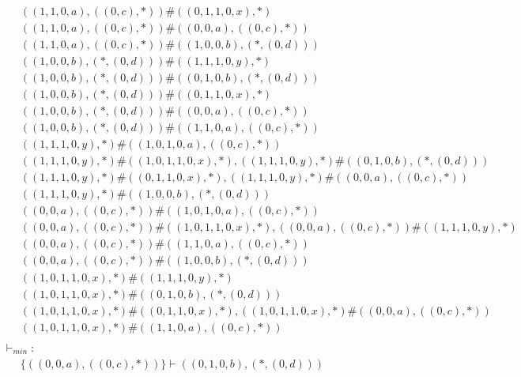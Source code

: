 \documentclass{article}
\begin{document}
\begin{align*}
	 & \qquad ((1, 1, 0, a), ((0, c), *)) \# ((0, 1, 1, 0, x), *) \\ 
	 & \qquad ((1, 1, 0, a), ((0, c), *)) \# ((0, 0, a), ((0, c), *)) \\ 
	 & \qquad ((1, 1, 0, a), ((0, c), *)) \# ((1, 0, 0, b), (*, (0, d))) \\ 
	 & \qquad ((1, 0, 0, b), (*, (0, d))) \# ((1, 1, 1, 0, y), *) \\ 
	 & \qquad ((1, 0, 0, b), (*, (0, d))) \# ((0, 1, 0, b), (*, (0, d))) \\ 
	 & \qquad ((1, 0, 0, b), (*, (0, d))) \# ((0, 1, 1, 0, x), *) \\ 
	 & \qquad ((1, 0, 0, b), (*, (0, d))) \# ((0, 0, a), ((0, c), *)) \\ 
	 & \qquad ((1, 0, 0, b), (*, (0, d))) \# ((1, 1, 0, a), ((0, c), *)) \\ 
	 & \qquad ((1, 1, 1, 0, y), *) \# ((1, 0, 1, 0, a), ((0, c), *)) \\ 
	 & \qquad ((1, 1, 1, 0, y), *) \# ((1, 0, 1, 1, 0, x), *), ((1, 1, 1, 0, y), *) \# ((0, 1, 0, b), (*, (0, d))) \\ 
	 & \qquad ((1, 1, 1, 0, y), *) \# ((0, 1, 1, 0, x), *), ((1, 1, 1, 0, y), *) \# ((0, 0, a), ((0, c), *)) \\ 
	 & \qquad ((1, 1, 1, 0, y), *) \# ((1, 0, 0, b), (*, (0, d))) \\ 
	 & \qquad ((0, 0, a), ((0, c), *)) \# ((1, 0, 1, 0, a), ((0, c), *)) \\ 
	 & \qquad ((0, 0, a), ((0, c), *)) \# ((1, 0, 1, 1, 0, x), *), ((0, 0, a), ((0, c), *)) \# ((1, 1, 1, 0, y), *) \\ 
	 & \qquad ((0, 0, a), ((0, c), *)) \# ((1, 1, 0, a), ((0, c), *)) \\ 
	 & \qquad ((0, 0, a), ((0, c), *)) \# ((1, 0, 0, b), (*, (0, d))) \\ 
	 & \qquad ((1, 0, 1, 1, 0, x), *) \# ((1, 1, 1, 0, y), *) \\ 
	 & \qquad ((1, 0, 1, 1, 0, x), *) \# ((0, 1, 0, b), (*, (0, d))) \\ 
	 & \qquad ((1, 0, 1, 1, 0, x), *) \# ((0, 1, 1, 0, x), *), ((1, 0, 1, 1, 0, x), *) \# ((0, 0, a), ((0, c), *)) \\ 
	 & \qquad ((1, 0, 1, 1, 0, x), *) \# ((1, 1, 0, a), ((0, c), *)) \\ 
	 & \ \  & \\ 
	 & \ \ \vdash_{{min}}: & \\ 
	 & \qquad \{ ((0, 0, a), ((0, c), *)) \} \vdash ((0, 1, 0, b), (*, (0, d))) \\ 

\end{align*}
\end{document}
